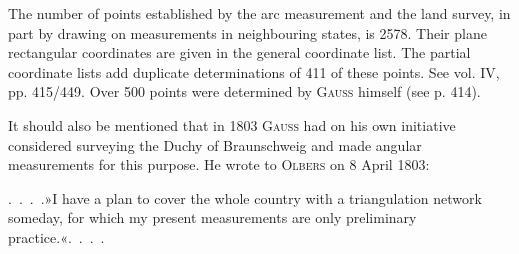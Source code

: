 \par\noindent\hspace*{\parindent}The number of points established by the arc measurement and the land survey, in part by drawing on measurements in neighbouring states, is 2578. Their plane rectangular coordinates are given in the general coordinate list. The partial coordinate lists add duplicate determinations of 411 of these points. See vol. IV, pp. 415/449. Over 500 points were determined by \textsc{Gauss} himself (see p. 414).
\par\bigskip
\par\noindent\hspace*{\parindent}It should also be mentioned that in 1803 \textsc{Gauss} had on his own initiative considered surveying the Duchy of Braunschweig and made angular measurements for this purpose. He wrote to \textsc{Olbers} on 8 April 1803:

\par\noindent\hspace*{\parindent}.\ .\ .\ .\enspace »I have a plan to cover the whole country with a triangulation network someday, for which my present measurements are only preliminary practice.«\enspace .\ .\ .\ .

